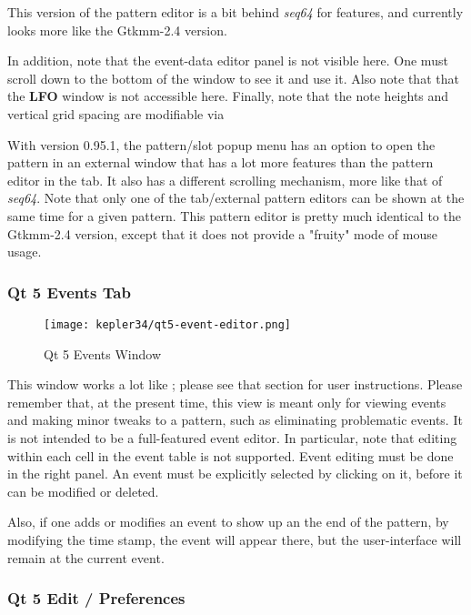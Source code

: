    This version of the pattern editor is a bit behind
   \textsl{seq64} for features, and currently looks more like the Gtkmm-2.4
   version.

   In addition, note that the event-data editor panel is not visible here.
   One must scroll down to the bottom of the window to see it and use it.
   Also note that that the \textbf{LFO} window is not accessible here.
   Finally, note that the note heights and vertical grid spacing are
   modifiable via

   With version 0.95.1, the pattern/slot popup menu has an option to open the
   pattern in an external window that has a lot more features than the
   pattern editor in the tab.  It also has a different scrolling mechanism,
   more like that of \textsl{seq64}.
   Note that only one of the tab/external pattern
   editors can be shown at the same time for a given pattern.
   This pattern editor is pretty much identical to the Gtkmm-2.4 version,
   except that it does not provide a "fruity" mode of mouse usage.

\subsubsection{Qt 5 Events Tab}
\label{subsubsec:qt_portmidi_qt5_events_tab}

\begin{figure}[H]
   \centering 
   \texttt{[image: kepler34/qt5-event-editor.png]}
   \caption{Qt 5 Events Window}
   \label{fig:qt5_events_window}
\end{figure}

This window works a lot like
; please see that section for user
instructions.
Please remember that, at the present time, this view is meant
only for viewing events and making minor tweaks to a pattern, such
as eliminating problematic events.  It is not intended to be a full-featured
event editor.  In particular, note that editing within each cell in the event
table is not supported.  Event editing must be done in the right panel.
An event must be explicitly selected by clicking on it, before it can be
modified or deleted.

Also, if one adds or modifies an event to show up an the end of the pattern,
by modifying the time stamp, the event will appear there, but the
user-interface will remain at the current event.

\subsubsection{Qt 5 Edit / Preferences}
\label{subsubsec:qt_portmidi_qt5_edit_prefs}

